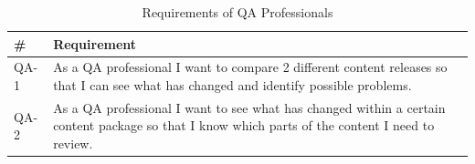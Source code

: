 
\begin{table}[h!]
\centering
\begin{tabular}{|l|p{12cm}|}
\hline
\rowcolor[HTML]{EFEFEF}
\textbf{\#} & \textbf{Requirement} \\ \hline
QA-1 & As a QA professional I want to compare 2 different content releases so that I can see what has changed and identify possible problems. \\ \hline
QA-2 & As a QA professional I want to see what has changed within a certain content package so that I know which parts of the content I need to review. \\ \hline
\end{tabular}
\caption{Requirements of QA Professionals}
\label{req-qa-professionals}
\end{table}



\clearpage

